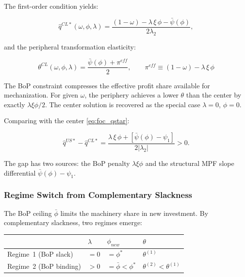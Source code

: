 \documentclass[11pt,a4paper]{article}
\begin{document}
{The first-order condition yields:

\begin{equation}
	\hat{q}^{CL*}(\omega,\phi,\lambda)
	=
	\frac{(1-\omega)-\lambda\,\xi\,\phi-\bar{\psi}(\phi)}
	{2\lambda_2},
	\label{eq:cl:foc_qstar}
\end{equation}

and the peripheral transformation elasticity:

\begin{equation}
	\boxed{
		\theta^{CL}(\omega,\phi,\lambda)
		=
		\frac{\bar{\psi}(\phi)+\pi^{eff}}{2},
		\qquad
		\pi^{eff}
		\equiv
		(1-\omega)-\lambda\,\xi\,\phi
	}
	\label{eq:cl:theta}
\end{equation}

The BoP constraint compresses the effective profit share available for
mechanization. For given $\omega$, the periphery achieves a lower
$\theta$ than the center by exactly $\lambda\xi\phi/2$. The center
solution is recovered as the special case $\lambda = 0$, $\phi = 0$.

Comparing with the center \eqref{eq:foc_qstar}:

\begin{equation}
	\hat{q}^{US*} - \hat{q}^{CL*}
	=
	\frac{
		\lambda\,\xi\,\phi
		+
		\left[\bar{\psi}(\phi)-\psi_1\right]
	}{
		2|\lambda_2|
	}
	>
	0.
	\label{eq:cl:q_gap}
\end{equation}

The gap has two sources: the BoP penalty $\lambda\xi\phi$ and the
structural MPF slope differential $\bar{\psi}(\phi)-\psi_1$.

\subsubsection{Regime Switch from Complementary Slackness}
\label{subsec:chile_regimes}

The BoP ceiling $\bar{\phi}$ limits the machinery share in new
investment. By complementary slackness, two regimes emerge:

\begin{center}
	\begin{tabular}{llll}
		\toprule
		& $\lambda$ & $\phi_{new}$ & $\theta$ \\
		\midrule
		Regime~1 (BoP slack)   & $= 0$ & $= \phi^*$            & $\theta^{(1)}$ \\
		Regime~2 (BoP binding) & $> 0$ & $= \bar{\phi} < \phi^*$
		& $\theta^{(2)} < \theta^{(1)}$ \\
		\bottomrule
	\end{tabular}
\end{center}

}
\end{document}
